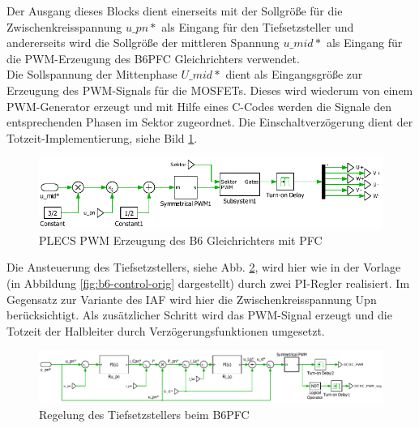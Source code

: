 			Der Ausgang dieses Blocks dient einerseits mit der Sollgröße für die Zwischenkreisspannung $u\_pn*$ als Eingang für den Tiefsetzsteller und andererseits wird die Sollgröße der mittleren Spannung $u\_mid*$ als Eingang für die PWM-Erzeugung des \gls{B6PFC} Gleichrichters verwendet.\\
			Die Sollspannung der Mittenphase $U\_mid*$ dient als Eingangsgröße zur Erzeugung des PWM-Signals für die \gls{MOSFET}s. Dieses wird wiederum von einem PWM-Generator erzeugt und mit Hilfe eines C-Codes werden die Signale den entsprechenden Phasen im Sektor zugeordnet. Die Einschaltverzögerung dient der Totzeit-Implementierung, siehe Bild \ref{fig:plecsb6controlpwmmid}.\\
			\begin{figure}
				\centering
				\includegraphics[width=0.9\linewidth]{content/Grafiken/PLECS_B6_ControlPWMmid}
				\caption{PLECS PWM Erzeugung des B6 Gleichrichters mit \gls{PFC}}
				\label{fig:plecsb6controlpwmmid}
			\end{figure}
			Die Ansteuerung des Tiefsetzstellers, siehe Abb. \ref{fig:b6buckcontrol}, wird hier wie in der Vorlage (in Abbildung \ref{fig:b6-control-orig} dargestellt) durch zwei PI-Regler realisiert. Im Gegensatz zur Variante des \gls{IAF} wird hier die Zwischenkreisspannung \gls{Upn} berücksichtigt. Als zusätzlicher Schritt wird das PWM-Signal erzeugt und die Totzeit der Halbleiter durch Verzögerungsfunktionen umgesetzt.  
\begin{figure}
	\centering
	\includegraphics[width=1\linewidth]{content/Grafiken/B6_Buck_Control}
	\caption{Regelung des Tiefsetzstellers beim \gls{B6PFC}}
	\label{fig:b6buckcontrol}
\end{figure}		
